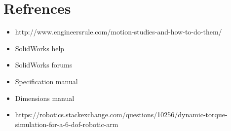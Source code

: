 \documentclass{book}
\begin{document}
\section{Refrences}
\begin{itemize}
	\item http://www.engineersrule.com/motion-studies-and-how-to-do-them/
	\item SolidWorks help
	\item SolidWorks forums
	\item Specification manual
	\item Dimensions manual
	\item https://robotics.stackexchange.com/questions/10256/dynamic-torque-simulation-for-a-6-dof-robotic-arm
\end{itemize}
\end{document}
